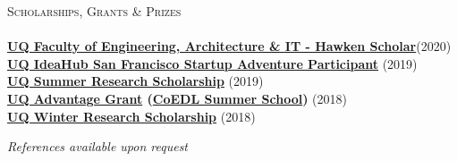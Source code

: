 \documentclass[a4paper]{article}
\newcommand{\lineunder} {
    \vspace*{-8pt} \\
    \hspace*{-10pt} \hrulefill \\
}
\newcommand{\header} [1] {
    {\hspace*{-10pt}\vspace*{6pt} \textsc{#1}}
    \vspace*{-6pt} \lineunder
}
\begin{document}
\header{Scholarships, Grants \& Prizes}
\textbf{\href{https://www.eait.uq.edu.au/eait-scholars-program}{UQ Faculty of Engineering, Architecture \& IT - Hawken Scholar}}\hfill (2020)\\
\textbf{\href{https://ventures.uq.edu.au/san-fran}{UQ IdeaHub San Francisco Startup Adventure Participant}} \hfill (2019)\\
\textbf{\href{https://employability.uq.edu.au/summer-winter-research}{UQ Summer Research Scholarship}} \hfill (2019)\\
\textbf{\href{https://employability.uq.edu.au/financial-support/employability-grant}{UQ Advantage Grant} (\href{http://www.dynamicsoflanguage.edu.au/education-and-outreach/train-with-us/summer-school-2018/}{CoEDL Summer School})} \hfill (2018)\\
\textbf{\href{https://employability.uq.edu.au/summer-winter-research}{UQ Winter Research Scholarship}} \hfill (2018)\\


\vspace{3.5mm}
\begin{center}
\small \textit{References available upon request}
\end{center}
\end{document}
